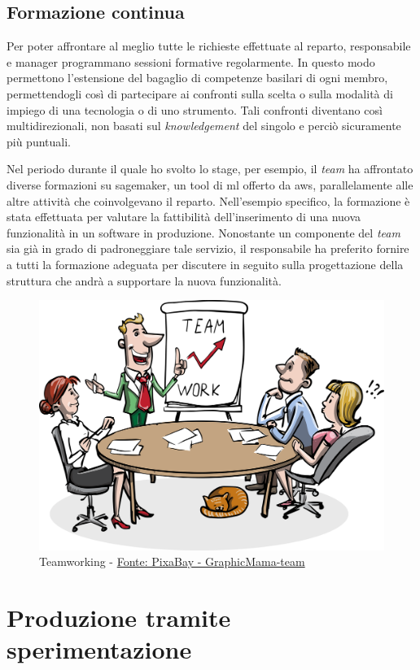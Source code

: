 \subsection{Formazione continua}
Per poter affrontare al meglio tutte le richieste effettuate al reparto, responsabile e manager programmano sessioni formative regolarmente. In questo modo permettono l'estensione del bagaglio di competenze basilari di ogni membro, permettendogli così di partecipare ai confronti sulla scelta o sulla modalità di impiego di una tecnologia o di uno strumento. Tali confronti diventano così multidirezionali, non basati sul \textit{knowledgement} del singolo e perciò sicuramente più puntuali.

Nel periodo durante il quale ho svolto lo stage, per esempio, il \textit{team} ha affrontato diverse formazioni su \gls{sagemaker}\glsfirstoccur, un tool di \acrlong{ml} offerto da \acrlong{aws}\glsfirstoccur, parallelamente alle altre attività che coinvolgevano il reparto. Nell'esempio specifico, la formazione è stata effettuata per valutare la fattibilità dell'inserimento di una nuova funzionalità in un software in produzione. Nonostante un componente del \textit{team} sia già in grado di padroneggiare tale servizio, il responsabile ha preferito fornire a tutti la formazione adeguata per discutere in seguito sulla progettazione della struttura che andrà a supportare la nuova funzionalità.

\begin{figure}[H] 
    \centering 
    \includegraphics[width=0.5\columnwidth]{immagini/team_working.png} 
    \caption{Teamworking - \href{https://pixabay.com/it/users/GraphicMama-team-2641041/?utm_source=link-attribution&amp;utm_medium=referral&amp;utm_campaign=image&amp;utm_content=1453895}{Fonte: PixaBay - GraphicMama-team}}
    \label{fig:teamworking}
\end{figure}
\section{Produzione tramite sperimentazione}
